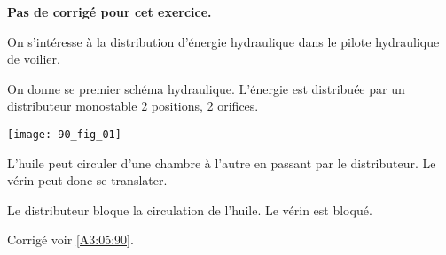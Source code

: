 \normaltrue \difficilefalse \tdifficilefalse
\correctionfalse

\setcounter{numques}{0}
\ifcorrection
\else
\textbf{Pas de corrigé pour cet exercice.}
\fi



\ifprof
\else
On s'intéresse à la distribution d'énergie hydraulique dans le pilote hydraulique de voilier. 

On donne se premier schéma hydraulique. L'énergie est distribuée par un distributeur monostable 2 positions, 2 orifices. 

\begin{center}
\texttt{[image: 90\_fig\_01]}
\end{center}


\fi


\ifprof
\begin{corrige}
L'huile peut circuler d'une chambre à l'autre en passant par le distributeur. Le vérin peut donc se translater.
\end{corrige}
\else
\fi

\ifprof
\begin{corrige}
Le distributeur bloque la circulation de l'huile. Le vérin est bloqué.
\end{corrige}
\else
\fi

\ifprof
\else
\begin{flushright}
\footnotesize{Corrigé  voir \ref{A3:05:90}.}
\end{flushright}%
\fi